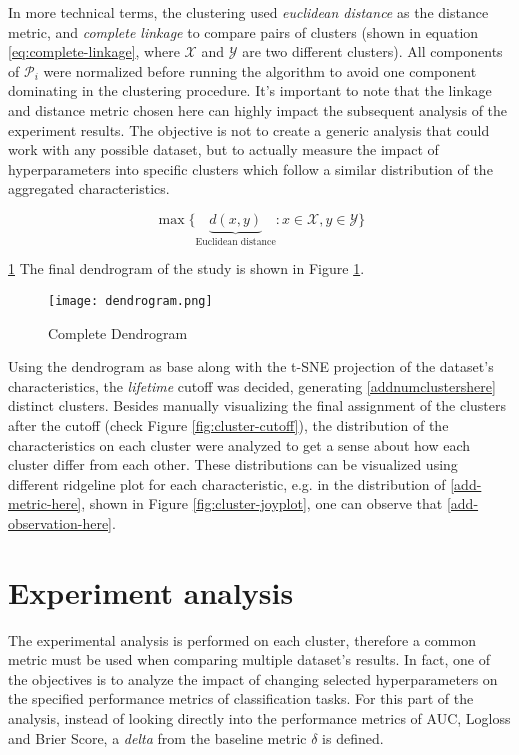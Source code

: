 In more technical terms, the clustering used \textit{euclidean distance} as the distance metric, and \textit{complete linkage} to compare pairs of clusters (shown in equation \ref{eq:complete-linkage}, where $\mathcal{X}$ and $\mathcal{Y}$ are two different clusters). All components of $\mathcal{P}_i$ were normalized before running the algorithm to avoid one component dominating in the clustering procedure. It's important to note that the linkage and distance metric chosen here can highly impact the subsequent analysis of the experiment results. The objective is not to create a generic analysis that could work with any possible dataset, but to actually measure the impact of hyperparameters into specific clusters which follow a similar distribution of the aggregated characteristics.


\begin{equation}
    \max\{\underbrace{d(x, y)}_{\text{Euclidean distance}}: x \in \mathcal{X}, y \in \mathcal{Y}\}
    \label{eq:complete-linkage}
\end{equation}

\ref{} %
The final dendrogram of the study is shown in Figure \ref{fig:dendrogram}. 
\begin{figure}[!h]
    \centering
    \texttt{[image: dendrogram.png]}
    \caption{Complete Dendrogram}
    \label{fig:dendrogram}
\end{figure}

Using the dendrogram as base along with the t-SNE projection of the dataset's characteristics, the \textit{lifetime} cutoff was decided, generating \ref{addnumclustershere} distinct clusters. Besides manually visualizing the final assignment of the clusters after the cutoff (check Figure \ref{fig:cluster-cutoff}), the distribution of the characteristics on each cluster were analyzed to get a sense about how each cluster differ from each other. These distributions can be visualized using different ridgeline plot for each characteristic, e.g. in the distribution of \ref{add-metric-here}, shown in Figure \ref{fig:cluster-joyplot}, one can observe that \ref{add-observation-here}.


\section{Experiment analysis}

The experimental analysis is performed on each cluster, therefore a common metric must be used when comparing multiple dataset's results. In fact, one of the objectives is to analyze the impact of changing selected hyperparameters on the specified performance metrics of classification tasks. For this part of the analysis, instead of looking directly into the performance metrics of AUC, Logloss and Brier Score, a \textit{delta} from the baseline metric $\delta$ is defined.

